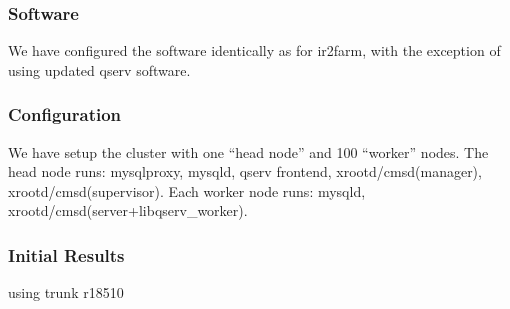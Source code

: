 \documentclass[DM,toc]{lsstdoc}
\begin{document}
\subsubsection{Software}\label{software}

We have configured the software identically as for ir2farm, with the
exception of using updated qserv software.

\subsubsection{Configuration}\label{configuration}

We have setup the cluster with one ``head node'' and 100 ``worker''
nodes. The head node runs: mysqlproxy, mysqld, qserv frontend,
xrootd/cmsd(manager), xrootd/cmsd(supervisor). Each worker node runs:
mysqld, xrootd/cmsd(server+libqserv\_worker).

\subsubsection{Initial Results}\label{initial-results}

using trunk r18510
\end{document}
